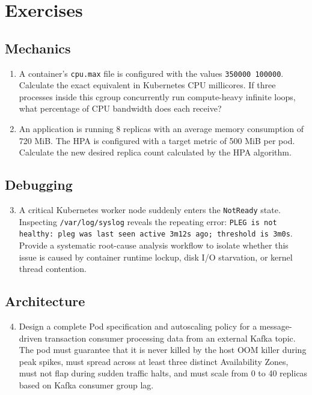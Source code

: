 \section{Exercises}

\subsection{Mechanics}
\begin{enumerate}[leftmargin=18pt]
  \item A container's \texttt{cpu.max} file is configured with the values \texttt{350000 100000}. Calculate the exact equivalent in Kubernetes CPU millicores. If three processes inside this cgroup concurrently run compute-heavy infinite loops, what percentage of CPU bandwidth does each receive?
  \item An application is running 8 replicas with an average memory consumption of 720 MiB. The HPA is configured with a target metric of 500 MiB per pod. Calculate the new desired replica count calculated by the HPA algorithm.
\end{enumerate}

\subsection{Debugging}
\begin{enumerate}[leftmargin=18pt]
  \setcounter{enumi}{2}
  \item A critical Kubernetes worker node suddenly enters the \texttt{NotReady} state. Inspecting \texttt{/var/log/syslog} reveals the repeating error: \texttt{PLEG is not healthy: pleg was last seen active 3m12s ago; threshold is 3m0s}. Provide a systematic root-cause analysis workflow to isolate whether this issue is caused by container runtime lockup, disk I/O starvation, or kernel thread contention.
\end{enumerate}

\subsection{Architecture}
\begin{enumerate}[leftmargin=18pt]
  \setcounter{enumi}{3}
  \item Design a complete Pod specification and autoscaling policy for a message-driven transaction consumer processing data from an external Kafka topic. The pod must guarantee that it is never killed by the host OOM killer during peak spikes, must spread across at least three distinct Availability Zones, must not flap during sudden traffic halts, and must scale from 0 to 40 replicas based on Kafka consumer group lag.
\end{enumerate}

